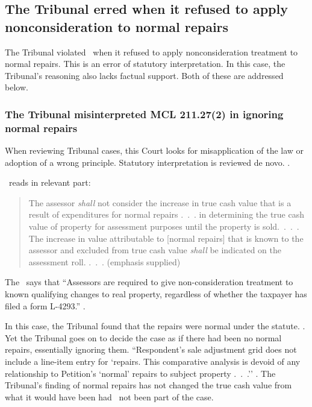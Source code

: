 \documentclass[12pt,\documentclassflag]{michiganCourtOfAppealsBrief}
\begin{document}
\subsection{The Tribunal erred when it refused to apply nonconsideration to normal repairs}

The Tribunal violated \mathieuGast\ when it refused to apply nonconsideration treatment to normal repairs. This is an error of statutory interpretation. In this case, the Tribunal's reasoning also lacks factual support. Both of these are addressed below.

\subsubsection{The Tribunal misinterpreted MCL 211.27(2) in ignoring normal repairs}

When reviewing Tribunal cases, this Court looks for misapplication of the law or adoption of a wrong principle. Statutory interpretation is reviewed de novo. . 

\mathieuGast\ reads in relevant part:

\begin{quote}
The assessor {\em shall} not consider the increase in true cash value that is a result of expenditures for normal repairs .~.~. in determining the true cash value of property for assessment purposes until the property is sold.~.~.~. The increase in value attributable to [normal repairs] that is known to the assessor and excluded from true cash value {\em shall} be indicated on the assessment roll. .~.~. (emphasis supplied)
\end{quote}

The \STC\ says that ``Assessors are required to give non-consideration treatment to known qualifying changes to real property, regardless of whether the taxpayer has filed a form L-4293.'' .

In this case, the Tribunal found that the repairs were normal under the statute. \foj[4]. Yet the Tribunal goes on to decide the case as if there had been no normal repairs, essentially ignoring them. ``Respondent's sale adjustment grid does not include a line-item entry for `repairs. This comparative analysis is devoid of any relationship to Petition's `normal' repairs to subject property .~.~.'' \foj[6]. The Tribunal's finding of normal repairs has not changed the true cash value from what it would have been had \mathieuGast\ not been part of the case.
\end{document}
